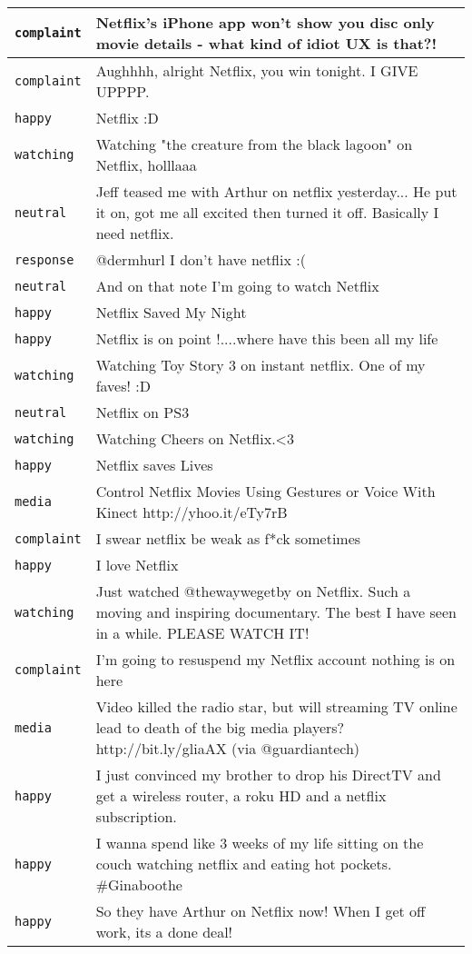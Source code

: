 {\begin{longtable}{|l|p{160mm}|}
      \tabularnewline\hline
         \texttt{complaint} & Netflix's iPhone app won't show you disc only movie details - what kind of idiot UX is that?!
      \tabularnewline\hline
         \texttt{complaint} & Aughhhh, alright Netflix, you win tonight. I GIVE UPPPP.
      \tabularnewline\hline
         \texttt{happy} & Netflix :D
      \tabularnewline\hline
         \texttt{watching} & Watching "the creature from the black lagoon" on Netflix, holllaaa
      \tabularnewline\hline
         \texttt{neutral} & Jeff teased me with Arthur on netflix yesterday... He put it on, got me all excited then turned it off. Basically I need netflix.
      \tabularnewline\hline
         \texttt{response} & @dermhurl I don't have netflix :(
      \tabularnewline\hline
         \texttt{neutral} & And on that note I'm going to watch Netflix
      \tabularnewline\hline
         \texttt{happy} & Netflix Saved My Night
      \tabularnewline\hline
         \texttt{happy} & Netflix is on point !....where have this been all my life
      \tabularnewline\hline
         \texttt{watching} & Watching Toy Story 3 on instant netflix. One of my faves! :D
      \tabularnewline\hline
         \texttt{neutral} & Netflix on PS3
      \tabularnewline\hline
         \texttt{watching} & Watching Cheers on Netflix.<3
      \tabularnewline\hline
         \texttt{happy} & Netflix saves Lives
      \tabularnewline\hline
         \texttt{media} & Control Netflix Movies Using Gestures or Voice With Kinect http://yhoo.it/eTy7rB
      \tabularnewline\hline
         \texttt{complaint} & I swear netflix be weak as f*ck sometimes
      \tabularnewline\hline
         \texttt{happy} & I love Netflix
      \tabularnewline\hline
         \texttt{watching} & Just watched @thewaywegetby on Netflix. Such a moving and inspiring documentary. The best I have seen in a while. PLEASE WATCH IT!
      \tabularnewline\hline
         \texttt{complaint} & I'm going to resuspend my Netflix account nothing is on here
      \tabularnewline\hline
         \texttt{media} & Video killed the radio star, but will streaming TV online lead to death of the big media players? http://bit.ly/gliaAX (via @guardiantech)
      \tabularnewline\hline
         \texttt{happy} & I just convinced my brother to drop his DirectTV and get a wireless router, a roku HD and a netflix subscription.
      \tabularnewline\hline
         \texttt{happy} & I wanna spend like 3 weeks of my life sitting on the couch watching netflix and eating hot pockets. \#Ginaboothe
      \tabularnewline\hline
         \texttt{happy} & So they have Arthur on Netflix now! When I get off work, its a done deal!

\end{longtable}}
